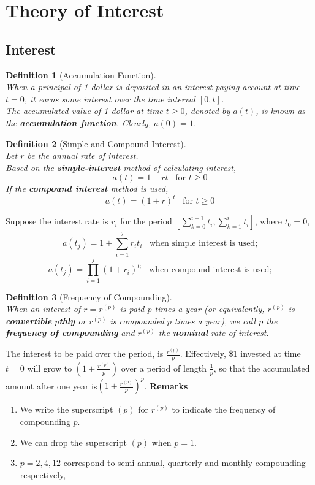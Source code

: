 \documentclass[11pt]{article}
\newtheorem{definition}{Definition}[section]
\theoremstyle{definition}
\begin{document}
\twocolumn
\section{Theory of Interest}
\subsection{Interest}
\begin{definition}[Accumulation Function]
\hfill\\\normalfont When a principal of 1 dollar is deposited in an interest-paying account at time $t=0$, it earns some interest over the time interval $[0,t]$. \\
The accumulated value of 1 dollar at time $t \geq 0$, denoted by $a(t)$, is known as the \textbf{accumulation function}. Clearly, $a(0)=1$.
\end{definition}
\begin{definition}[Simple and Compound Interest]
\hfill\\\normalfont Let $r$ be the annual rate of interest.\\
Based on the \textbf{simple-interest} method of calculating interest,
\[
a(t)=1+rt\;\;\;\text{for }t \geq 0
\]
If the \textbf{compound interest} method is used,
\[
a(t)=(1+r)^t \;\;\;\text{for }t\geq 0
\]
\end{definition}
Suppose the interest rate is $r_i$ for the period $[\sum_{k=0}^{i-1} t_i,\sum_{k=1}^{i} t_{i} ]$, where $t_0 = 0$, 
\[
a(t_j)=1+\sum_{i=1}^j r_it_i \;\;\;\text{when simple interest is used;}
\]
\[
a(t_j)=\prod_{i=1}^j (1+r_i)^{t_i}\;\;\;\text{when compound interest is used;}
\]
\begin{definition}[Frequency of Compounding]
\hfill\\\normalfont When an interest of $r = r^{(p)}$ is paid $p$ times a year (or equivalently, $r^{(p)}$ is \textbf{convertible} $p$\textbf{thly} or $r^{(p)}$ is compounded $p$ times a year), we call $p$ the \textbf{frequency of compounding} and $r^{(p)}$ the \textbf{nominal} rate of interest.
\end{definition}
The interest to be paid over the period, is $\frac{r^{(p)}}{p}$. Effectively, \$1 invested at time $t=0$ will grow to $\left(1+\frac{r^{(p)}}{p}\right)$ over a period of length $\frac{1}{p}$, so that the accumulated amount after one year is$\left(1+\frac{r^{(p)}}{p}\right)^p$.
\textbf{Remarks}
\begin{enumerate}
  \item We write the superscript $(p)$ for $r^{(p)}$ to indicate the frequency of compounding $p$.
  \item We can drop the superscript $(p)$ when $p=1$.
  \item $p = 2, 4, 12 $ correspond to semi-annual, quarterly and monthly compounding respectively,
\end{enumerate}
\end{document}
